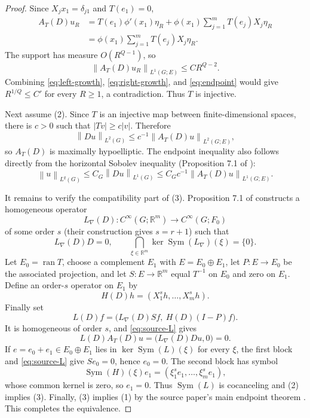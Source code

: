 \documentclass[11pt]{article}
\newcommand{\R}{\mathbb R}
\newcommand{\norm}[1]{\left\lVert#1\right\rVert}
\newcommand{\Sym}{\operatorname{Sym}}
\newcommand{\ran}{\operatorname{ran}}
\begin{document}
\begin{proof}
Since $X_jx_1=\delta_{j1}$ and $T(e_1)=0$,
\begin{align*}
 A_T(D)u_R
 &=T(e_1)\phi'(x_1)\eta_R
   +\phi(x_1)\sum_{j=1}^mT(e_j)X_j\eta_R\\
 &=\phi(x_1)\sum_{j=1}^mT(e_j)X_j\eta_R.
\end{align*}
The support has measure $O(R^{Q-1})$, so
\begin{equation}\label{eq:right-growth}
 \norm{A_T(D)u_R}_{L^1(G;E)}\le CR^{Q-2}.
\end{equation}
Combining \eqref{eq:left-growth}, \eqref{eq:right-growth}, and
\eqref{eq:endpoint} would give $R^{1/Q}\le C'$ for every $R\ge1$, a
contradiction.  Thus $T$ is injective.

Next assume (2).  Since $T$ is an injective map between finite-dimensional
spaces, there is $c>0$ such that $|Tv|\ge c|v|$.  Therefore
\begin{equation}\label{eq:maxhyp}
 \norm{Du}_{L^2(G)}\le c^{-1}\norm{A_T(D)u}_{L^2(G;E)},
\end{equation}
so $A_T(D)$ is maximally hypoelliptic.  The endpoint inequality also follows
directly from the horizontal Sobolev inequality (Proposition 7.1 of
\cite{VSY}):
\[
 \norm{u}_{L^q(G)}\le C_G\norm{Du}_{L^1(G)}
 \le C_Gc^{-1}\norm{A_T(D)u}_{L^1(G;E)}.
\]

It remains to verify the compatibility part of (3).  Proposition 7.1 of
\cite{VSY} constructs a homogeneous operator
\[
 L_\nabla(D):C^\infty(G;\R^m)\longrightarrow C^\infty(G;F_0)
\]
of some order $s$ (their construction gives $s=r+1$) such that
\begin{equation}\label{eq:source-L}
 L_\nabla(D)D=0,
 \qquad
 \bigcap_{\xi\in\R^m}\ker\Sym(L_\nabla)(\xi)=\{0\}.
\end{equation}
Let $E_0=\ran T$, choose a complement $E_1$ with $E=E_0\oplus E_1$, let
$P:E\to E_0$ be the associated projection, and let $S:E\to\R^m$ equal
$T^{-1}$ on $E_0$ and zero on $E_1$.  Define an order-$s$ operator on $E_1$
by
\[
 H(D)h=(X_1^sh,\ldots,X_m^sh).
\]
Finally set
\begin{equation}\label{eq:block-L}
 L(D)f=\bigl(L_\nabla(D)Sf,\ H(D)(I-P)f\bigr).
\end{equation}
It is homogeneous of order $s$, and \eqref{eq:source-L} gives
\[
 L(D)A_T(D)u
 =\bigl(L_\nabla(D)Du,0\bigr)=0.
\]
If $e=e_0+e_1\in E_0\oplus E_1$ lies in
$\ker\Sym(L)(\xi)$ for every $\xi$, the first block and
\eqref{eq:source-L} give $Se_0=0$, hence $e_0=0$.  The second block has
symbol
\[
 \Sym(H)(\xi)e_1=(\xi_1^se_1,\ldots,\xi_m^se_1),
\]
whose common kernel is zero, so $e_1=0$.  Thus $\Sym(L)$ is cocanceling and
(2) implies (3).  Finally, (3) implies (1) by the source paper's main
endpoint theorem \cite[Theorem 4.1]{VSY}.  This completes the equivalence.
\end{proof}
\end{document}
